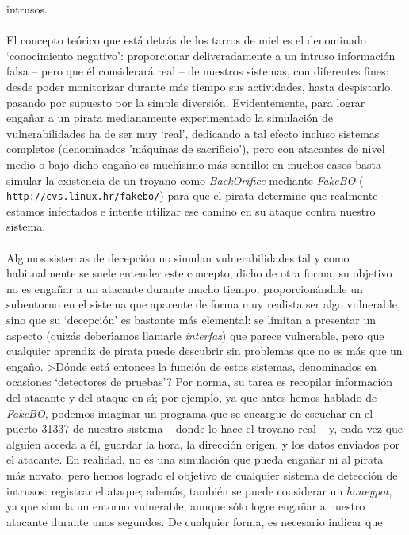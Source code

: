 intrusos.\\
\\El concepto te\'orico que est\'a detr\'as de los tarros de miel es el 
denominado `conocimiento ne\-ga\-ti\-vo': proporcionar deliveradamente a un 
intruso 
informaci\'on falsa -- pero que \'el considerar\'a real -- de nuestros sistemas,
con diferentes fines: desde poder monitorizar durante m\'as tiempo sus 
actividades, hasta despistarlo, pasando por supuesto por la simple 
diversi\'on. Evidentemente, para lograr enga\~nar a un pirata medianamente
experimentado la simulaci\'on de vulnerabilidades ha de ser muy `real', 
dedicando a tal efecto incluso sistemas completos (denominados 'm\'aquinas de
sacrificio'), pero con atacantes de nivel medio o bajo dicho enga\~no es 
much\'{\i}simo m\'as sencillo: en muchos casos basta simular la existencia de 
un troyano como {\it BackOrifice} mediante {\it FakeBO} ({\tt 
http://cvs.linux.hr/fakebo/}) para que el pirata determine que realmente 
estamos infectados e intente utilizar ese camino en su ataque contra nuestro 
sistema.\\
\\Algunos sistemas de decepci\'on no simulan vulnerabilidades tal y como 
habitualmente se suele entender este concepto; dicho de otra forma, su objetivo
no es enga\~nar a un atacante durante mucho tiempo, proporcion\'andole un 
subentorno en el sistema que aparente de forma muy realista ser algo vulnerable,
sino que su `decepci\'on' es bastante m\'as elemental: se limitan a presentar
un aspecto (quiz\'as deber\'{\i}amos llamarle {\it interfaz}) que parece 
vulnerable, pero que cualquier aprendiz de pirata puede descubrir sin problemas 
que no es m\'as que un enga\~no. >D\'onde est\'a entonces la funci\'on de estos
sistemas, denominados en ocasiones `detectores de pruebas'? Por norma, su tarea 
es recopilar informaci\'on del atacante y del
ataque en s\'{\i}; por ejemplo, ya que antes hemos hablado de {\it FakeBO}, 
podemos imaginar un programa que se encargue de escuchar en el puerto 31337 de
nuestro sistema -- donde lo hace el troyano real -- y, cada vez que alguien 
acceda a \'el, guardar
la hora, la direcci\'on origen, y los datos enviados por el atacante. En 
realidad, no es una simulaci\'on que pueda enga\~nar ni al pirata m\'as novato,
pero hemos logrado el objetivo de cualquier sistema de detecci\'on de intrusos: 
registrar el ataque; adem\'as, tambi\'en se puede considerar un {\it honeypot},
ya que simula un entorno vulnerable, aunque s\'olo logre enga\~nar a nuestro
atacante durante unos segundos. De cualquier forma, es necesario indicar que
